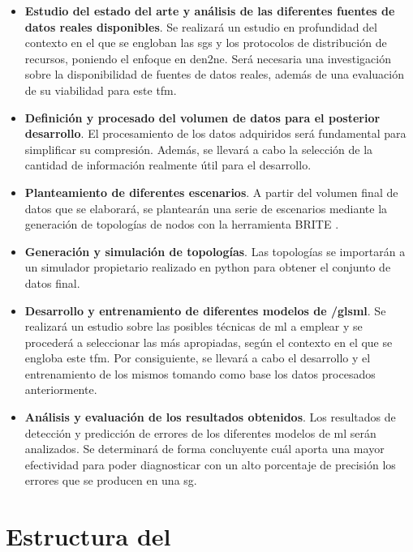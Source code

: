 \begin{itemize}
    \item \textbf{Estudio del estado del arte y análisis de las diferentes fuentes de datos reales disponibles}. Se realizará un estudio en profundidad del contexto en el que se engloban las \gls{sg}s y los protocolos de distribución de recursos, poniendo el enfoque en  \gls{den2ne}. Será necesaria una investigación sobre la disponibilidad de  fuentes de datos reales, además de una evaluación de su viabilidad para este \gls{tfm}.
    
    \item \textbf{Definición y procesado del volumen de datos para el posterior desarrollo}. El procesamiento de los datos adquiridos será fundamental para simplificar su compresión. Además, se llevará a cabo la selección de la cantidad de información realmente útil para el desarrollo.    

    \item \textbf{Planteamiento de diferentes escenarios}. A partir del volumen final de datos que se elaborará, se plantearán una serie de escenarios mediante la generación de topologías de nodos con la herramienta BRITE \cite{brite}.
    
    \item \textbf{Generación y simulación de topologías}. Las topologías se importarán a un simulador propietario realizado en python para obtener el conjunto de datos final.
    
    \item \textbf{Desarrollo y entrenamiento de diferentes modelos de /gls{ml}}. Se realizará un estudio sobre las posibles técnicas de \gls{ml} a emplear y se procederá a seleccionar las más apropiadas, según el contexto en el que se engloba este \gls{tfm}. Por consiguiente, se llevará a cabo el desarrollo y el entrenamiento de los mismos tomando como base los datos procesados anteriormente. 
    
    \item \textbf{Análisis y evaluación de los resultados obtenidos}. Los resultados de detección y predicción de errores de los diferentes modelos de \gls{ml} serán analizados. Se determinará de forma concluyente cuál aporta una mayor efectividad para poder diagnosticar con un alto porcentaje de precisión los errores que se producen en una \gls{sg}.
    
\end{itemize}


\section{Estructura del }
\label{sec:structure}

